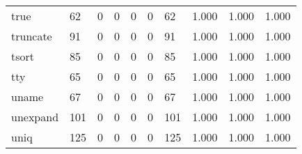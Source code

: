\begin{longtable}{lp{2.0cm}p{2.0cm}p{2.0cm}p{2.0cm}p{2.0cm}p{2.0cm}p{2.0cm}p{2.0cm}p{2.0cm}}
true      &                     62 &                                             0 &                                            0 &                                           0 &                                            0 &                                         62 &                                1.000 &                                  1.000 &                                1.000 \\
truncate  &                     91 &                                             0 &                                            0 &                                           0 &                                            0 &                                         91 &                                1.000 &                                  1.000 &                                1.000 \\
tsort     &                     85 &                                             0 &                                            0 &                                           0 &                                            0 &                                         85 &                                1.000 &                                  1.000 &                                1.000 \\
tty       &                     65 &                                             0 &                                            0 &                                           0 &                                            0 &                                         65 &                                1.000 &                                  1.000 &                                1.000 \\
uname     &                     67 &                                             0 &                                            0 &                                           0 &                                            0 &                                         67 &                                1.000 &                                  1.000 &                                1.000 \\
unexpand  &                    101 &                                             0 &                                            0 &                                           0 &                                            0 &                                        101 &                                1.000 &                                  1.000 &                                1.000 \\
uniq      &                    125 &                                             0 &                                            0 &                                           0 &                                            0 &                                        125 &                                1.000 &                                  1.000 &                                1.000 \\

\end{longtable}
